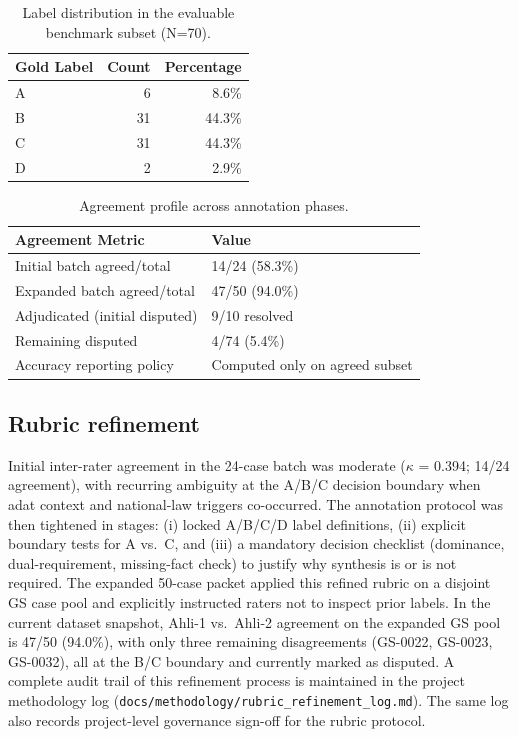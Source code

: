 \documentclass[11pt]{article}
\begin{document}
\begin{table}[h]
\centering
\begin{tabular}{lrr}
\toprule
Gold Label & Count & Percentage \\
\midrule
A & 6 & 8.6\% \\
B & 31 & 44.3\% \\
C & 31 & 44.3\% \\
D & 2 & 2.9\% \\
\bottomrule
\end{tabular}
\caption{Label distribution in the evaluable benchmark subset (N=70).}
\label{tab:labeldist}
\end{table}

\begin{table}[h]
\centering
\begin{tabular}{ll}
\toprule
Agreement Metric & Value \\
\midrule
Initial batch agreed/total & 14/24 (58.3\%) \\
Expanded batch agreed/total & 47/50 (94.0\%) \\
Adjudicated (initial disputed) & 9/10 resolved \\
Remaining disputed & 4/74 (5.4\%) \\
Accuracy reporting policy & Computed only on agreed subset \\
\bottomrule
\end{tabular}
\caption{Agreement profile across annotation phases.}
\label{tab:consensus}
\end{table}

\subsection{Rubric refinement}
Initial inter-rater agreement in the 24-case batch was moderate ($\kappa$ = 0.394; 14/24 agreement), with recurring ambiguity at the A/B/C decision boundary when adat context and national-law triggers co-occurred.
The annotation protocol was then tightened in stages: (i) locked A/B/C/D label definitions, (ii) explicit boundary tests for A vs.~C, and (iii) a mandatory decision checklist (dominance, dual-requirement, missing-fact check) to justify why synthesis is or is not required.
The expanded 50-case packet applied this refined rubric on a disjoint GS case pool and explicitly instructed raters not to inspect prior labels.
In the current dataset snapshot, Ahli-1 vs.~Ahli-2 agreement on the expanded GS pool is 47/50 (94.0\%), with only three remaining disagreements (GS-0022, GS-0023, GS-0032), all at the B/C boundary and currently marked as disputed.
A complete audit trail of this refinement process is maintained in the project methodology log (\texttt{docs/methodology/rubric\_refinement\_log.md}).
The same log also records project-level governance sign-off for the rubric protocol.
\end{document}
